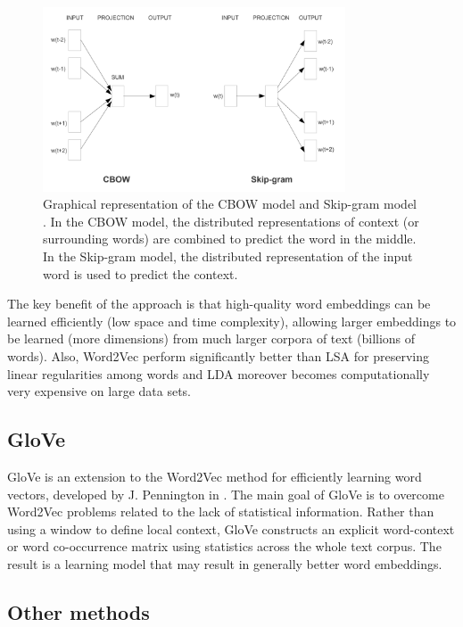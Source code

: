 \begin{figure}
  \centering
  \includegraphics[width=0.8\textwidth]{figures/word2vec-training-models.png}
  \caption[Graphical representation of the CBOW model and Skip-gram model]{
    Graphical representation of the CBOW model and Skip-gram model
    \cite{mikolov2013exploiting}. In the CBOW model, the distributed
    representations of context (or surrounding words) are combined to
    predict the word in the middle. In the Skip-gram model, the
    distributed representation of the input word is used to predict
    the context.
  }
  \label{fig:word2vec-learning-models}
\end{figure}

The key benefit of the approach is that high-quality word embeddings
can be learned efficiently (low space and time complexity), allowing
larger embeddings to be learned (more dimensions) from much larger
corpora of text (billions of words). Also, Word2Vec perform
significantly better than LSA for preserving linear regularities among
words and LDA moreover becomes computationally very expensive on
large data sets.

\subsection{GloVe}

GloVe is an extension to the Word2Vec method for efficiently learning
word vectors, developed by J. Pennington \etal{} in
\cite{pennington2014glove}. The main goal of GloVe is to overcome
Word2Vec problems related to the lack of statistical information.
Rather than using a window to define local context, GloVe constructs
an explicit word-context or word co-occurrence matrix using statistics
across the whole text corpus. The result is a learning model that may
result in generally better word embeddings.

\subsection{Other methods}

